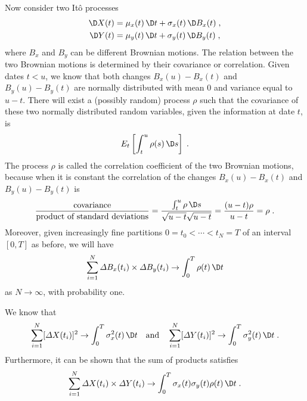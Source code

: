 Now consider two It\^o processes
\begin{subequations}\label{itoprocess110111}
\begin{align}
\D X(t) &= \mu_x(t)\,\D t + \sigma_x(t)\,\D B_x(t)\;,\label{itoprocess110}\\
\D Y(t) &= \mu_y(t)\,\D t + \sigma_y(t)\,\D B_y(t)\;,\label{itoprocess111}
\end{align}
\end{subequations}
where $B_x$ and $B_y$ can be different Brownian motions.  The relation between the two Brownian motions is determined by their covariance or correlation.  Given dates $t<u$, we know that both changes $B_x(u)-B_x(t)$ and $B_y(u)-B_y(t)$ are normally distributed with mean 0 and variance equal to $u-t$.  There will exist a (possibly random) process $\rho$ such that the covariance  of these two normally distributed random variables, given the information at date $t$, is 
$$E_t \left[\int_t^u \rho(s)\,\D s\right]\; .$$
The process $\rho$ is called the correlation coefficient of the two Brownian motions,  because when it is constant the correlation of the changes $B_x(u)-B_x(t)$ and $B_y(u)-B_y(t)$ is
$$\frac{\text{covariance}}{\text{product of standard deviations}}  = \frac{\int_t^u \rho \,\D s}{\sqrt{u-t} \sqrt{u-t}} = \frac{(u-t)\rho}{u-t} = \rho\; .$$
Moreover, given increasingly fine partitions $0=t_0 < \cdots < t_N=T$ of an interval $[0,T]$ as before, we will have
$$\sum_{i=1}^N \varDelta B_x(t_i) \times \varDelta B_y(t_i) \rightarrow \int_0^T \rho(t)\,\D t$$
as $N \rightarrow \infty$, with probability one.  

We know that
\begin{equation}\label{itoprocess112}\sum _{i=1}^N [\varDelta X(t_i)]^2 \rightarrow \int_0^T \sigma_x^2(t)\,\D t \quad \text{and}\quad  \sum _{i=1}^N [\varDelta Y(t_i)]^2 \rightarrow \int_0^T\sigma_y^2(t)\,\D t\;.
\end{equation}
Furthermore, it can be shown that the sum of products satisfies
\begin{equation}\label{itoprocess113}
\sum_{i=1}^N \varDelta X(t_i) \times \varDelta Y(t_i) \rightarrow \int_0^T \sigma_x(t)\sigma_y(t)\rho(t)\,\D t\;.
\end{equation}

